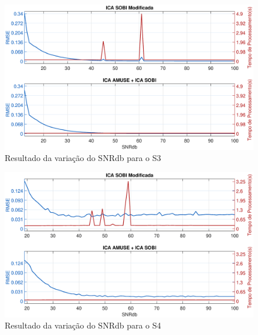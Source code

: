 \documentclass[a4paper,12pt]{monografia}
\theoremstyle{plain}
\theoremstyle{definition}
\theoremstyle{remark}
\begin{document}
\begin{figure}[!htb]
    \begin{center}
    \advance\leftskip -1.5cm
    \includegraphics[scale=0.45]{imagens/Sinal3Ruidov2.eps}
    \caption{Resultado da variação do SNRdb para o S3}
    \label{fig:ruidos3}    
    \end{center}
\end{figure}

\begin{figure}[!htb]
    \begin{center}
    \advance\leftskip -1.5cm
    \includegraphics[scale=0.45]{imagens/Sinal4Ruidov2.eps}
    \caption{Resultado da variação do SNRdb para o S4}
    \label{fig:ruidos4}    
    \end{center}
\end{figure}
\end{document}
